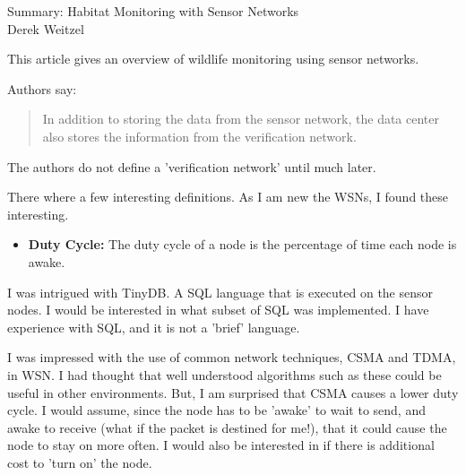 \documentclass[12pt]{article}
\begin{document}
\begin{center}
{\huge Summary: Habitat Monitoring with Sensor Networks } \\
Derek Weitzel
\end{center}

This article gives an overview of wildlife monitoring using sensor networks.  

Authors say:
\begin{quote}
In addition to storing the data from the sensor network, the data center also stores the information from the verification network.
\end{quote}
The authors do not define a 'verification network' until much later.

There where a few interesting definitions.  As I am new the WSNs, I found these interesting.
\begin{itemize}
\item { \bf Duty Cycle:} The duty cycle of a node is the percentage of time each node is awake.
\end{itemize}

I was intrigued with TinyDB.  A SQL language that is executed on the sensor nodes.  I would be interested in what subset of SQL was implemented.  I have experience with SQL, and it is not a 'brief' language.

I was impressed with the use of common network techniques, CSMA and TDMA, in WSN.  I had thought that well understood algorithms such as these could be useful in other environments.  But, I am surprised that CSMA causes a lower duty cycle.  I would assume, since the node has to be 'awake' to wait to send, and awake to receive (what if the packet is destined for me!), that it could cause the node to stay on more often.  I would also be interested in if there is additional cost to 'turn on' the node.  
\end{document}
